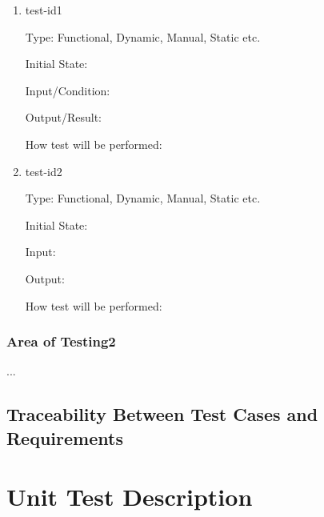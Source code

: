\documentclass[12pt, titlepage]{article}
\begin{document}
\begin{enumerate}

    \item{test-id1\\}

    Type: Functional, Dynamic, Manual, Static etc.

    Initial State:

    Input/Condition:

    Output/Result:

    How test will be performed:

    \item{test-id2\\}

    Type: Functional, Dynamic, Manual, Static etc.

    Initial State:

    Input:

    Output:

    How test will be performed:

\end{enumerate}

\subsubsection{Area of Testing2}

...

\subsection{Traceability Between Test Cases and Requirements}



\newpage{}

\section{Unit Test Description}
\label{sec:unit_test_description}

 
\end{document}
